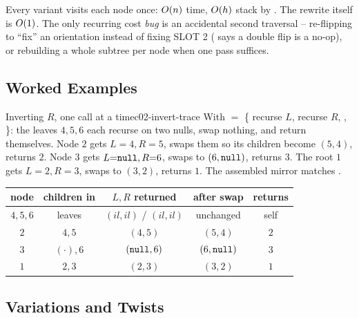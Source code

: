 \begin{complexitybox}
Every variant visits each node once: $O(n)$ time, $O(h)$ stack by
. The rewrite itself is $O(1)$. The only recurring
cost \emph{bug} is an accidental second traversal -- re-flipping to ``fix'' an
orientation instead of fixing SLOT 2 ( says a double flip
is a no-op), or rebuilding a whole subtree per node when one pass suffices.
\end{complexitybox}

\subsection{Worked Examples}

\begin{example}{Inverting $R$, one call at a time}{c02-invert-trace}
With  $=$ \{ recurse $L$, recurse $R$, ,
 \}: the leaves $4,5,6$ each recurse on two nulls, swap nothing, and
return themselves. Node $2$ gets $L{=}4,R{=}5$, swaps them so its children become
$(5,4)$, returns $2$. Node $3$ gets $L{=}\texttt{null},R{=}6$, swaps to $(6,\texttt{null})$, returns
$3$. The root $1$ gets $L{=}2,R{=}3$, swaps to $(3,2)$, returns $1$. The assembled
mirror matches .
\end{example}

\begin{tracebox}
\begin{center}\renewcommand{\arraystretch}{1.15}
\begin{tabular}{@{}c c c c c@{}}
\toprule
\textbf{node} & \textbf{children in} & \textbf{$L,R$ returned} & \textbf{after swap} & \textbf{returns}\\
\midrule
$4,5,6$ & leaves   & $(
il,
il)$ / $(
il,
il)$ & unchanged & self\\
$2$     & $4,5$    & $(4,5)$   & $(5,4)$   & $2$\\
$3$     & $(\cdot),6$ & $(\texttt{null},6)$ & $(6,\texttt{null})$ & $3$\\
$1$     & $2,3$    & $(2,3)$   & $(3,2)$   & $1$\\
\bottomrule
\end{tabular}\end{center}
\end{tracebox}

\subsection{Variations and Twists}

